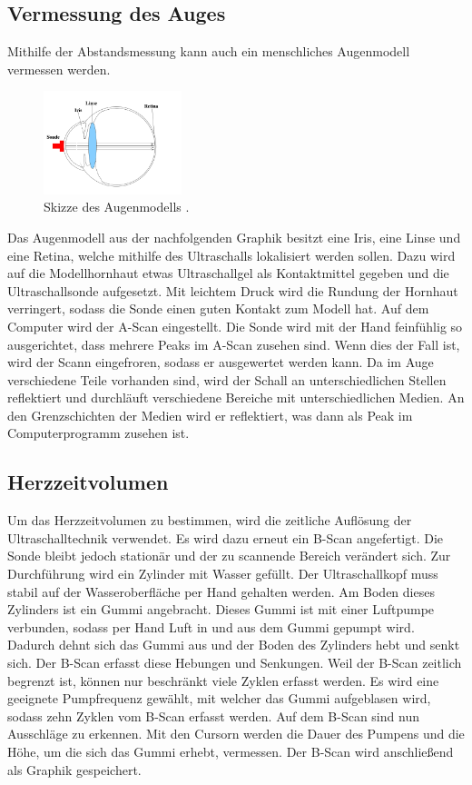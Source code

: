 \newpage
\subsection{Vermessung des Auges}
Mithilfe der Abstandsmessung kann auch ein menschliches Augenmodell vermessen werden.
\begin{figure}
    \begin{center}
        \includegraphics[height=3cm]{content/Augenmodell.png}
        \caption{Skizze des Augenmodells \cite{Versuchsanleitung_US2}.}
    \end{center}
    \label{fig:Augenmodell}
\end{figure}
Das Augenmodell aus der nachfolgenden Graphik besitzt eine Iris, eine Linse und eine Retina, 
welche mithilfe des Ultraschalls lokalisiert werden sollen.
Dazu wird auf die Modellhornhaut etwas Ultraschallgel als Kontaktmittel 
gegeben und die Ultraschallsonde aufgesetzt. Mit leichtem Druck wird die Rundung der Hornhaut 
verringert, sodass die Sonde einen guten Kontakt zum Modell hat. Auf dem Computer wird der A-Scan 
eingestellt. Die Sonde wird mit der Hand feinfühlig so ausgerichtet, dass mehrere Peaks im A-Scan 
zusehen sind. Wenn dies der Fall ist, wird der Scann eingefroren, sodass er ausgewertet werden kann.
Da im Auge verschiedene Teile vorhanden sind, wird der Schall an unterschiedlichen Stellen 
reflektiert und durchläuft verschiedene Bereiche mit unterschiedlichen Medien. An den Grenzschichten 
der Medien wird er reflektiert, was dann als Peak im Computerprogramm zusehen ist. 


\subsection{Herzzeitvolumen}

Um das Herzzeitvolumen zu bestimmen, wird die zeitliche Auflösung der Ultraschalltechnik verwendet. 
Es wird dazu erneut ein B-Scan angefertigt. Die Sonde bleibt jedoch stationär und der zu scannende 
Bereich verändert sich. Zur Durchführung wird ein Zylinder mit Wasser gefüllt. Der Ultraschallkopf 
muss stabil auf der Wasseroberfläche per Hand gehalten werden. Am Boden dieses 
Zylinders ist ein Gummi angebracht. Dieses Gummi ist mit einer Luftpumpe verbunden, sodass per Hand 
Luft in und aus dem Gummi gepumpt wird. Dadurch dehnt sich das Gummi aus und der Boden des Zylinders 
hebt und senkt sich. Der B-Scan erfasst diese Hebungen und Senkungen. Weil der B-Scan zeitlich 
begrenzt ist, können nur beschränkt viele Zyklen erfasst werden. Es wird eine geeignete Pumpfrequenz 
gewählt, mit welcher das Gummi aufgeblasen wird, sodass zehn Zyklen vom B-Scan erfasst werden. Auf 
dem B-Scan sind nun Ausschläge zu erkennen. Mit den Cursorn werden die Dauer des Pumpens und die Höhe, um 
die sich das Gummi erhebt, vermessen. Der B-Scan wird anschließend als Graphik gespeichert.


